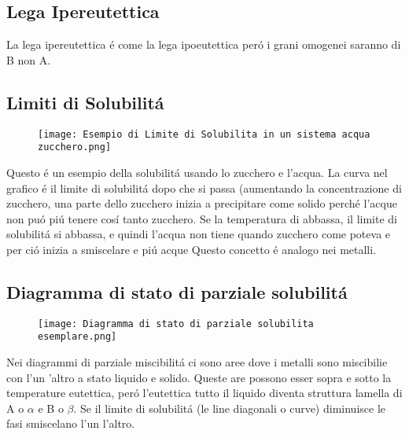 \documentclass{article}
\begin{document}
{        \subsection{Lega Ipereutettica}
            La lega ipereutettica \'e come la lega ipoeutettica per\'o i grani omogenei saranno di B non A.
            \newpage
        \subsection{Limiti di Solubilit\'a}
            \begin{figure}[h!]
                \centering
                \texttt{[image: Esempio di Limite di Solubilita in un sistema acqua zucchero.png]}
            \end{figure}
            Questo \'e un esempio della solubilit\'a usando lo zucchero e l'acqua. La curva nel grafico \'e il limite di solubilit\'a dopo che si passa (aumentando la concentrazione di zucchero, una parte dello zucchero inizia a precipitare come solido perch\'e l'acque non pu\'o pi\'u tenere cos\'i tanto zucchero. Se la temperatura di abbassa, il limite di solubilit\'a si abbassa, e quindi l'acqua non tiene quando zucchero come poteva e per ci\'o inizia a smiscelare e pi\'u acque  Questo concetto \'e analogo nei metalli.
        \subsection{Diagramma di stato di parziale solubilit\'a}
            \begin{figure}[h!]
                \centering
                \texttt{[image: Diagramma di stato di parziale solubilita esemplare.png]}
            \end{figure}
            Nei diagrammi di parziale miscibilit\'a ci sono aree dove i metalli sono miscibilie con l'un 'altro a stato liquido e solido. Queste are possono esser sopra e sotto la temperature eutettica, per\'o l'eutettica tutto il liquido diventa struttura lamella di A o $\alpha$ e B o $\beta$. Se il limite di solubilit\'a (le line diagonali o curve) diminuisce le fasi smiscelano l'un l'altro.
        \newpage
}
\end{document}

